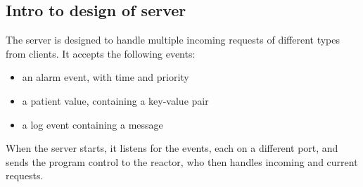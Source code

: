 \documentclass[Main]{subfiles}
\begin{document}
\subsection{Intro to design of server}
The server is designed to handle multiple incoming requests of different types from clients.
It accepts the following events:
\begin{itemize}
\item an alarm event, with time and priority
\item a patient value, containing a key-value pair
\item a log event containing a message
\end{itemize}
When the server starts, it listens for the events, each on a different port, and sends the program control to the reactor, who then handles incoming and current requests.
\end{document}
